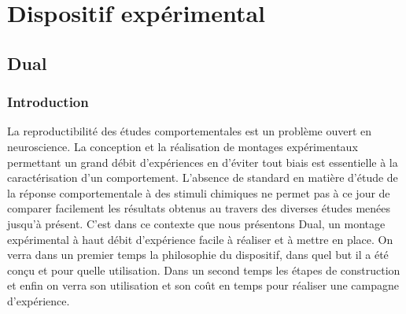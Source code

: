 \chapter{Dispositif expérimental}

  \section{Dual}
  \subsection{Introduction}
  La reproductibilité des études comportementales est un problème ouvert en neuroscience. La conception et la réalisation de montages expérimentaux permettant un grand débit d'expériences en d'éviter tout biais est essentielle à la caractérisation d'un comportement. L'absence de standard en matière d'étude de la réponse comportementale à des stimuli chimiques ne permet pas à ce jour de comparer facilement les résultats obtenus au travers des diverses études menées jusqu'à présent. C'est dans ce contexte que nous présentons Dual, un montage expérimental à haut débit d'expérience facile à réaliser et à mettre en place.
  \medbreak
  On verra dans un premier temps la philosophie du dispositif, dans quel but il a été conçu et pour quelle utilisation. Dans un second temps les étapes de construction et enfin on verra son utilisation et son coût en temps pour réaliser une campagne d'expérience.
